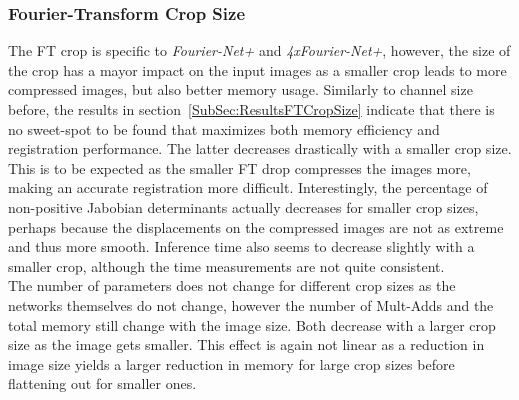 \subsubsection{Fourier-Transform Crop Size} \label{SubSubSec:DiscussionFTCropSize}
The FT crop is specific to \emph{Fourier-Net+} and \emph{4xFourier-Net+}, however, the size of the crop has a mayor impact on the input images as a smaller crop leads to more compressed images, but also better memory usage. Similarly to channel size before, the results in section~\ref{SubSec:ResultsFTCropSize} indicate that there is no sweet-spot to be found that maximizes both memory efficiency and registration performance. The latter decreases drastically with a smaller crop size. This is to be expected as the smaller FT drop compresses the images more, making an accurate registration more difficult. Interestingly, the percentage of non-positive Jabobian determinants actually decreases for smaller crop sizes, perhaps because the displacements on the compressed images are not as extreme and thus more smooth. Inference time also seems to decrease slightly with a smaller crop, although the time measurements are not quite consistent.\\
The number of parameters does not change for different crop sizes as the networks themselves do not change, however the number of Mult-Adds and the total memory still change with the image size. Both decrease with a larger crop size as the image gets smaller. This effect is again not linear as a reduction in image size yields a larger reduction in memory for large crop sizes before flattening out for smaller ones. 

